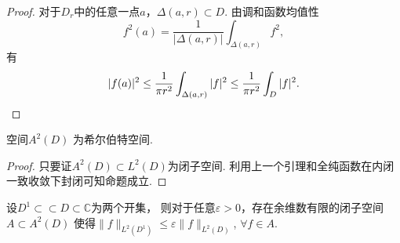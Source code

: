 \begin{proof}
	对于$D_r$中的任意一点$a$，$\Delta(a,r)\subset D$. 由调和函数均值性
	\[f^2(a)=\frac{1}{|\Delta(a,r)|}\int_{\Delta(a,r)}f^2,\]
	有$$\vert f(a)\vert^2
    \leq \frac{1}{\pi r^2}\int_{\Delta(a,r)} |f|^2
    \leq \frac{1}{\pi r^2}\int_D |f|^2.\qedhere$$
\end{proof}

\begin{proposition}
    空间$A^2(D)$ 为希尔伯特空间.
\end{proposition}
\begin{proof}
    只要证$A^2(D)\subset L^2(D)$为闭子空间.
    利用上一个引理和全纯函数在内闭一致收敛下封闭可知命题成立.
\end{proof}

\begin{lemma}[$L^2$-Schwarz引理]
	设$D^1\subset \subset D\subset \mathbb{C}$为两个开集，
    则对于任意$\varepsilon>0$，存在余维数有限的闭子空间$A\subset A^2(D)$
    使得$\|f\|_{L^2(D^1)}\leq \varepsilon \|f\|_{L^2(D)}$, $\forall f\in A$.
\end{lemma}
		
